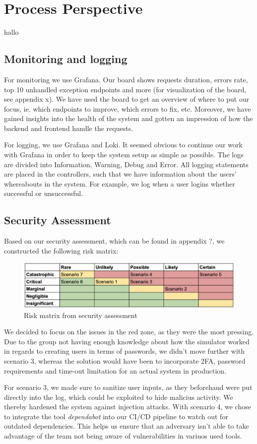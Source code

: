 \section{Process Perspective}
hallo \cite{devopshandbook}
\subsection{Monitoring and logging}
For monitoring we use Grafana. Our board shows requests duration, errors rate, top 10 unhandled exception endpoints and more (for visualization of the board, see appendix x). We have used the board to get an overview of where to put our focus, ie. which endpoints to improve, which errors to fix, etc. Moreover, we have gained insights into the health of the system and gotten an impression of how the backend and frontend handle the requests.

For logging, we use Grafana and Loki. It seemed obvious to continue our work with Grafana in order to keep the system setup as simple as possible. The logs are divided into Information, Warning, Debug and Error. All logging statements are placed in the controllers, such that we have information about the users' whereabouts in the system. For example, we log when a user logins whether successful or unsuccessful.
\subsection{Security Assessment}
Based on our security assessment, which can be found in appendix ?, we constructed the following risk matrix:
\begin{figure}[H]
    \centering
    \includegraphics[width=0.7\linewidth]{images/risk-matrix.png}
    \caption{Risk matrix from security assessment}
    \label{fig:enter-label}
\end{figure}
We decided to focus on the issues in the red zone, as they were the most pressing. Due to the group not having enough knowledge about how the simulator worked in regards to creating users in terms of passwords, we didn't move further with scenario 3, whereas the solution would have been to incorporate 2FA, password requirements and time-out limitation for an actual system in production.

For scenario 3, we made sure to sanitize user inputs, as they beforehand were put directly into the log, which could be exploited to hide malicius activity. We thereby hardened the system against injection attacks.
With scenario 4, we chose to integrate the tool \textit{dependabot} into our CI/CD pipeline to watch out for outdated dependencies. This helps us ensure that an adversary isn't able to take advantage of the team not being aware of vulnerabilities in variuos used tools.

